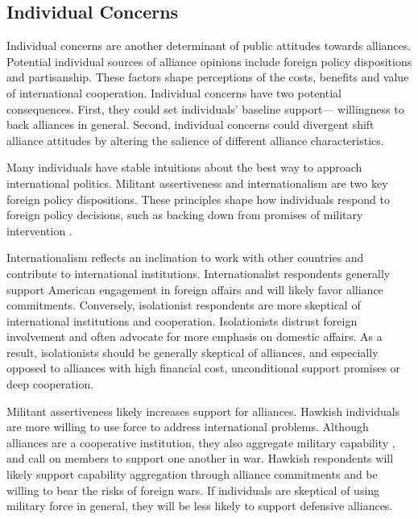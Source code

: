 \documentclass[12pt]{article}
\begin{document}
\subsection{Individual Concerns}


Individual concerns are another determinant of public attitudes towards alliances. 
Potential individual sources of alliance opinions include foreign policy dispositions and partisanship. 
These factors shape perceptions of the costs, benefits and value of international cooperation. 
Individual concerns have two potential consequences. 
First, they could set individuals' baseline support--- willingness to back alliances in general. 
Second, individual concerns could divergent shift alliance attitudes by altering the salience of different alliance characteristics. 


Many individuals have stable intuitions about the best way to approach international politics. 
Militant assertiveness and internationalism \citep{Herrmannetal1999} are two key foreign policy dispositions.  
These principles shape how individuals respond to foreign policy decisions, such as backing down from promises of military intervention \citep{KertzerBrutger2016}. 


Internationalism reflects an inclination to work with other countries and contribute to international institutions. 
Internationalist respondents generally support American engagement in foreign affairs and will likely favor alliance commitments. 
Conversely, isolationist respondents are more skeptical of international institutions and cooperation. 
Isolationists distrust foreign involvement and often advocate for more emphasis on domestic affairs. 
As a result, isolationists should be generally skeptical of alliances, and especially opposed to alliances with high financial cost, unconditional support promises or deep cooperation. 


Militant assertiveness likely increases support for alliances. 
Hawkish individuals are more willing to use force to address international problems. 
Although alliances are a cooperative institution, they also aggregate military capability \citep{FordhamPoast2014}, and call on members to support one another in war.
Hawkish respondents will likely support capability aggregation through alliance commitments and be willing to bear the risks of foreign wars.  
If individuals are skeptical of using military force in general, they will be less likely to support defensive alliances. 
\end{document}
